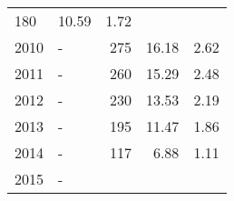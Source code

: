 \begin{longtable}{lXrrr}
       \num{180} &
       \num[round-mode=places,round-precision=2]{10,59} &
         \num[round-mode=places,round-precision=2]{1,72} \\

     2010 &
     \multicolumn{1}{X}{ -  } &


       \num{275} &
       \num[round-mode=places,round-precision=2]{16,18} &
         \num[round-mode=places,round-precision=2]{2,62} \\

     2011 &
     \multicolumn{1}{X}{ -  } &


       \num{260} &
       \num[round-mode=places,round-precision=2]{15,29} &
         \num[round-mode=places,round-precision=2]{2,48} \\

     2012 &
     \multicolumn{1}{X}{ -  } &


       \num{230} &
       \num[round-mode=places,round-precision=2]{13,53} &
         \num[round-mode=places,round-precision=2]{2,19} \\

     2013 &
     \multicolumn{1}{X}{ -  } &


       \num{195} &
       \num[round-mode=places,round-precision=2]{11,47} &
         \num[round-mode=places,round-precision=2]{1,86} \\

     2014 &
     \multicolumn{1}{X}{ -  } &


       \num{117} &
       \num[round-mode=places,round-precision=2]{6,88} &
         \num[round-mode=places,round-precision=2]{1,11} \\

     2015 &
     \multicolumn{1}{X}{ -  } &



\end{longtable}

